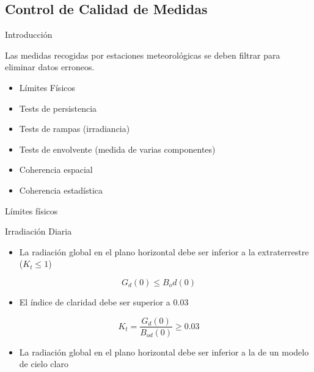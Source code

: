 \documentclass[xcolor={usenames,svgnames,dvipsnames}]{beamer}
\begin{document}
\subsection{Control de Calidad de Medidas}
\label{sec:org28bd6d7}

\begin{frame}[label={sec:org8b7a193}]{Introducción}
\begin{block}{Las medidas recogidas por estaciones meteorológicas se deben filtrar para eliminar datos erroneos.}
\begin{itemize}
\item Límites Físicos
\item Tests de persistencia
\item Tests de rampas (irradiancia)
\item Tests de envolvente (medida de varias componentes)
\item Coherencia espacial
\item Coherencia estadística
\end{itemize}
\end{block}
\end{frame}



\begin{frame}[label={sec:org53e9474}]{Límites físicos}
\begin{block}{Irradiación Diaria}
\begin{itemize}
\item La radiación global en el plano horizontal debe ser inferior a la extraterrestre (\(K_t \leq 1\))
\end{itemize}
\[
G_d(0) \leq B_od(0)
\]

\begin{itemize}
\item El índice de claridad debe ser superior a 0.03
\end{itemize}
\[
K_t = \frac{G_d(0)}{B_{od}(0)} \geq 0.03
\]

\begin{itemize}
\item La radiación global en el plano horizontal debe ser inferior a la de un modelo de cielo claro
\end{itemize}

\nocite{Younes.Claywell.ea2005, Estevez.Gavilan.ea2011, Geiger.Diabate.ea2002}
\end{block}
\end{frame}
\end{document}
